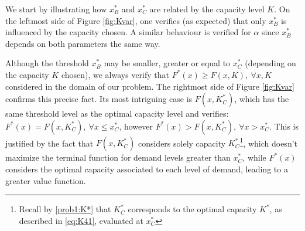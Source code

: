 We start by illustrating how $x^*_B$ and $x^*_C$ are related by the capacity level $K$. On the leftmost side of Figure \ref{fig:Kvar}, one verifies (as expected) that only $x_B^*$ is influenced by the capacity chosen. A similar behaviour is verified for $\alpha$ since $x^*_B$ depends on both parameters the same way.

Although the threshold $x_B^*$ may be smaller, greater or equal to $x^*_C$ (depending on the capacity $K$ chosen), we always verify that $F^*(x) \geq F(x,K), \ \forall x, K$ considered in the domain of our problem.
The rightmost side of Figure \ref{fig:Kvar} confirms this precise fact. Its most intriguing case is $F(x,K^*_C)$, which has the same threshold level as the optimal capacity level and verifies: $F^*(x)=F(x,K^*_C), \ \forall x \leq x^*_C$, however 
$F^*(x)>F(x,K^*_C), \ \forall x > x^*_C$. This is justified by the fact that $F(x,K^*_C)$ considers solely capacity $K_C^*$\footnote{Recall by \eqref{prob1:K*} that $K^*_C$ corresponds to the optimal capacity $K^*$, as described in \eqref{eq:K41}, evaluated at $x_C^*$}, which doesn't maximize the terminal function for demand levels greater than $x_C^*$, while $F^*(x)$ considers the optimal capacity associated to each level of demand, leading to a greater value function.




